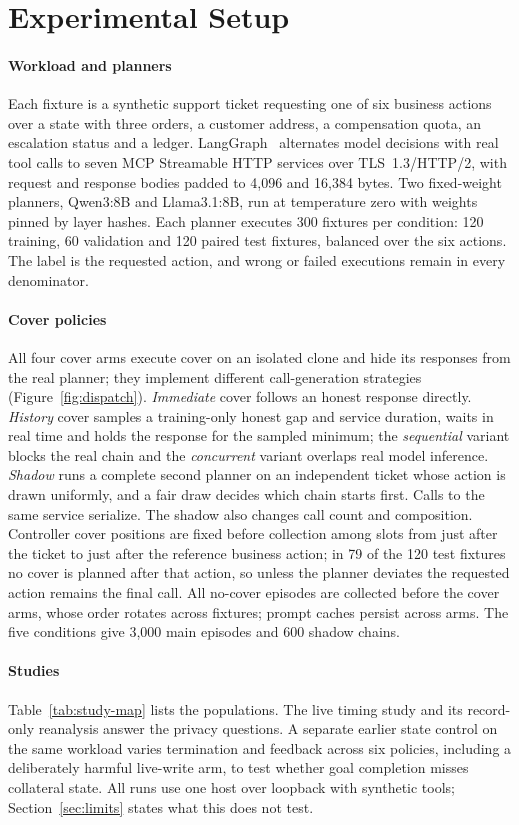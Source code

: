 \section{Experimental Setup}\label{sec:setup}
\paragraph{Workload and planners}
Each fixture is a synthetic support ticket requesting one of six business actions over a state with three orders, a customer address, a compensation quota, an escalation status and a ledger. LangGraph~\cite{langchain2025langgraph} alternates model decisions with real tool calls to seven MCP Streamable HTTP services over TLS~1.3/HTTP/2, with request and response bodies padded to 4,096 and 16,384 bytes. Two fixed-weight planners, Qwen3:8B and Llama3.1:8B, run at temperature zero with weights pinned by layer hashes. Each planner executes 300 fixtures per condition: 120 training, 60 validation and 120 paired test fixtures, balanced over the six actions. The label is the requested action, and wrong or failed executions remain in every denominator.

\paragraph{Cover policies}
All four cover arms execute cover on an isolated clone and hide its responses from the real planner; they implement different call-generation strategies (Figure~\ref{fig:dispatch}). \emph{Immediate} cover follows an honest response directly. \emph{History} cover samples a training-only honest gap and service duration, waits in real time and holds the response for the sampled minimum; the \emph{sequential} variant blocks the real chain and the \emph{concurrent} variant overlaps real model inference. \emph{Shadow} runs a complete second planner on an independent ticket whose action is drawn uniformly, and a fair draw decides which chain starts first. Calls to the same service serialize. The shadow also changes call count and composition. Controller cover positions are fixed before collection among slots from just after the ticket to just after the reference business action; in 79 of the 120 test fixtures no cover is planned after that action, so unless the planner deviates the requested action remains the final call. All no-cover episodes are collected before the cover arms, whose order rotates across fixtures; prompt caches persist across arms. The five conditions give 3,000 main episodes and 600 shadow chains.




\paragraph{Studies}
Table~\ref{tab:study-map} lists the populations. The live timing study and its record-only reanalysis answer the privacy questions. A separate earlier state control on the same workload varies termination and feedback across six policies, including a deliberately harmful live-write arm, to test whether goal completion misses collateral state. All runs use one host over loopback with synthetic tools; Section~\ref{sec:limits} states what this does not test.
